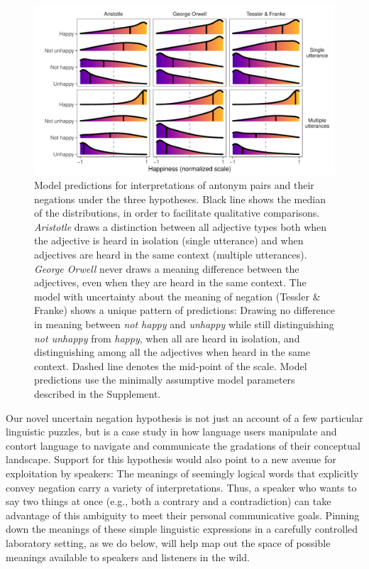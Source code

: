 \documentclass[floatsintext,doc]{apa6}
\begin{document}
\begin{figure}[t]
\centering \includegraphics{figs/alternativeModels_dists4.pdf} 
\caption{Model predictions for interpretations of antonym pairs and their negations under the three hypotheses. Black line shows the median of the distributions, in order to facilitate qualitative comparisons. \emph{Aristotle} draws a distinction between all adjective types both when the adjective is heard in isolation (single utterance) and when adjectives are heard in the same context (multiple utterances). \emph{George Orwell} never draws a meaning difference between the adjectives, even when they are heard in the same context. The model with uncertainty about the meaning of negation (Tessler \& Franke) shows a unique pattern of predictions: Drawing no difference in meaning between \emph{not happy} and \emph{unhappy} while still distinguishing \emph{not unhappy} from \emph{happy}, when all are heard in isolation, and distinguishing among all the adjectives when heard in the same context. Dashed line denotes the mid-point of the scale. Model predictions use the minimally assumptive model parameters described in the Supplement.}
\label{fig:modelPredictions}
\end{figure}


Our novel uncertain negation hypothesis is not just an account of a few particular linguistic puzzles, but is a case study in how language users manipulate and contort language to navigate and communicate the gradations of their conceptual landscape. 
Support  for this hypothesis would also point to a new avenue for exploitation by speakers: The meanings of seemingly logical words that explicitly convey negation carry a variety of interpretations.
Thus, a speaker who wants to say two things at once (e.g., both a contrary and a contradiction) can take advantage of this ambiguity  to meet their personal communicative goals. 
Pinning down the meanings of these simple linguistic expressions in a carefully controlled laboratory setting, as we do below, will help map out the space of possible meanings available to speakers and listeners in the wild. 
\end{document}
